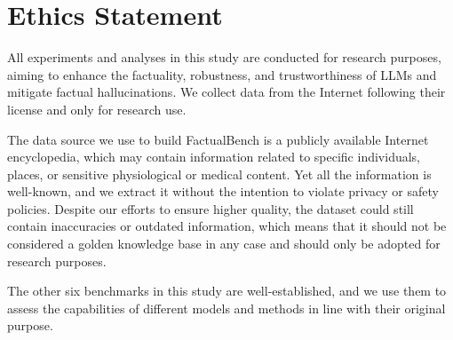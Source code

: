 \section*{Ethics Statement}
All experiments and analyses in this study are conducted for research purposes, aiming to enhance the factuality, robustness, and trustworthiness of LLMs and mitigate factual hallucinations. We collect data from the Internet following their license and only for research use.

The data source we use to build FactualBench is a publicly available Internet encyclopedia, which may contain information related to specific individuals, places, or sensitive physiological or medical content. Yet all the information is well-known, and we extract it without the intention to violate privacy or safety policies. Despite our efforts to ensure higher quality, the dataset could still contain inaccuracies or outdated information, which means that it should not be considered a golden knowledge base in any case and should only be adopted for research purposes.

The other six benchmarks in this study are well-established, and we use them to assess the capabilities of different models and methods in line with their original purpose. 
